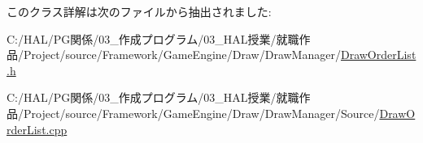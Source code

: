 このクラス詳解は次のファイルから抽出されました\+:\begin{DoxyCompactItemize}
\item 
C\+:/\+H\+A\+L/\+P\+G関係/03\+\_\+作成プログラム/03\+\_\+\+H\+A\+L授業/就職作品/\+Project/source/\+Framework/\+Game\+Engine/\+Draw/\+Draw\+Manager/\mbox{\hyperlink{_draw_order_list_8h}{Draw\+Order\+List.\+h}}\item 
C\+:/\+H\+A\+L/\+P\+G関係/03\+\_\+作成プログラム/03\+\_\+\+H\+A\+L授業/就職作品/\+Project/source/\+Framework/\+Game\+Engine/\+Draw/\+Draw\+Manager/\+Source/\mbox{\hyperlink{_draw_order_list_8cpp}{Draw\+Order\+List.\+cpp}}\end{DoxyCompactItemize}

